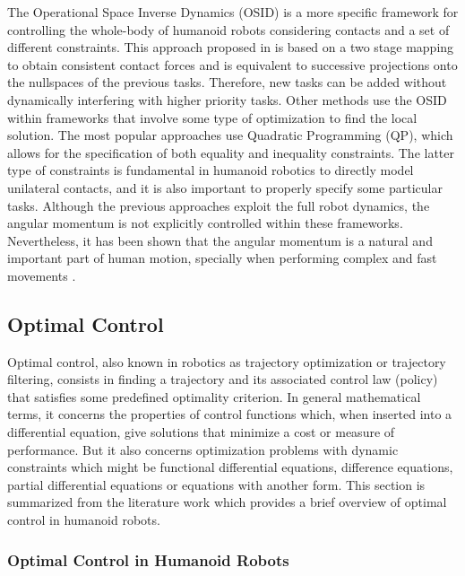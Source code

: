 The Operational Space Inverse Dynamics (OSID) is a more specific framework for controlling the whole-body of humanoid robots considering contacts and a set of different constraints. This approach
proposed in \cite{khatib2004whole,sentis2005control} is based on a two stage mapping to obtain consistent contact forces and is equivalent to successive projections onto the nullspaces of the previous tasks. Therefore, 
new tasks can be added without dynamically interfering with higher priority tasks. Other methods use the OSID within frameworks that 
involve some type of optimization to find the local solution. The most popular approaches use Quadratic Programming (QP), which allows for the specification of both equality and inequality constraints.
The latter type of constraints is fundamental in humanoid robotics to directly model unilateral contacts, and it is also important to properly specify some particular tasks. Although the previous approaches exploit the full robot dynamics, 
the angular momentum is not explicitly controlled within these frameworks. Nevertheless, it has been shown that the angular momentum 
is a natural and important part of human motion, specially when performing complex and fast movements \cite{popovic2004angular}. 

\subsection{Optimal Control}

Optimal control, also known in robotics as trajectory optimization or trajectory filtering, consists in finding a trajectory and its associated control law (policy) that satisfies some predefined 
optimality criterion. In general mathematical terms, it concerns the properties of control functions which, when inserted into a differential equation, give solutions that minimize a cost or measure
 of performance. But it also concerns optimization problems with dynamic constraints which might be functional differential equations, difference equations, partial differential equations or equations 
 with another form. This section is summarized from the literature work \cite{ramosponce} which provides a brief overview of optimal control in humanoid robots.


\subsubsection{Optimal Control in Humanoid Robots}

